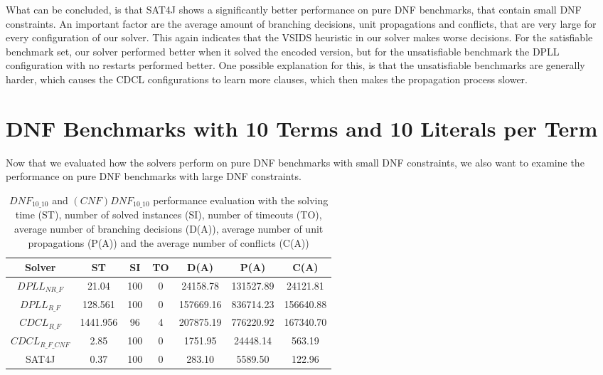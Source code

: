 What can be concluded, is that SAT4J shows a significantly better performance on pure DNF benchmarks, that contain small DNF constraints. An important factor are the average amount of branching decisions, unit propagations and conflicts, that are very large for every configuration of our solver. This again indicates that the VSIDS heuristic in our solver makes worse decisions. For the satisfiable benchmark set, our solver performed better when it solved the encoded version, but for the unsatisfiable benchmark the DPLL configuration with no restarts performed better. One possible explanation for this, is that the unsatisfiable benchmarks are generally harder, which causes the CDCL configurations to learn more clauses, which then makes the propagation process slower.

\section{DNF Benchmarks with 10 Terms and 10 Literals per Term}

Now that we evaluated how the solvers perform on pure DNF benchmarks with small DNF constraints, we also want to examine the performance on pure DNF benchmarks with large DNF constraints.

\begin{table}[!htb]
\centering
\caption[$DNF_{10\_10}$ and $(CNF)DNF_{10\_10}$ performance evaluation]{$DNF_{10\_10}$ and $(CNF)DNF_{10\_10}$ performance evaluation with the solving time (ST), number of solved instances (SI), number of timeouts (TO), average number of branching decisions (D(A)), average number of unit propagations (P(A)) and the average number of conflicts (C(A))}
\label{tab:dnf1010Sat}
\begin{tabular}{|c|c|c|c|c|c|c|}
\hline
Solver & ST & SI & TO & D(A) & P(A) & C(A)\\ 
\hline
$DPLL_{NR\_F}$ & 21.04 & 100 & 0 & 24158.78 & 131527.89 & 24121.81 \\ 
\hline
$DPLL_{R\_F}$ & 128.561 & 100 & 0 & 157669.16 & 836714.23 & 156640.88 \\ 
\hline
$CDCL_{R\_F}$ & 1441.956 & 96 & 4 & 207875.19 & 776220.92 & 167340.70 \\ 
\hline
$CDCL_{R\_F\_CNF}$ & 2.85 & 100 & 0 & 1751.95 & 24448.14 & 563.19 \\ 
\hline
SAT4J & 0.37 & 100 & 0 & 283.10 & 5589.50 & 122.96 \\ 
\hline
\end{tabular}
\end{table}

